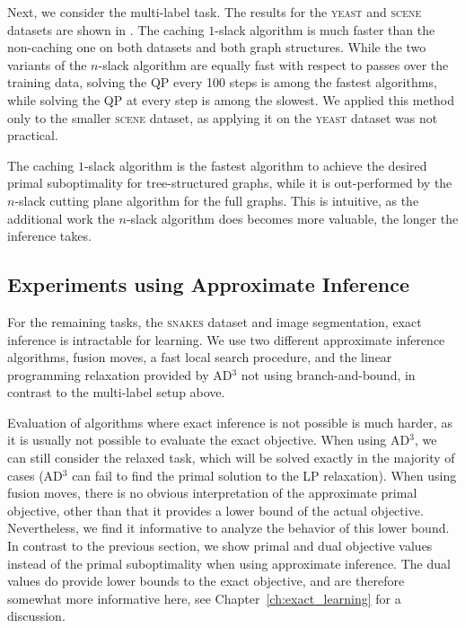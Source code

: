Next, we consider the multi-label task.  The results for the \textsc{yeast} and \textsc{scene}
datasets are shown in . The caching $1$-slack
algorithm is much faster than the non-caching one on both datasets and both
graph structures.
While the two variants of the $n$-slack algorithm are equally fast with respect
to passes over the training data, solving the QP every 100 steps is among the
fastest algorithms, while solving the QP at every step is among the slowest.
We applied this method only to the smaller \textsc{scene} dataset, as applying it on the
\textsc{yeast} dataset was not practical.

The caching $1$-slack algorithm is the fastest algorithm to achieve the desired
primal suboptimality for tree-structured graphs, while it is out-performed by
the $n$-slack cutting plane algorithm for the full graphs. This is intuitive,
as the additional work the $n$-slack algorithm does becomes more valuable, the
longer the inference takes. 



\subsection{Experiments using Approximate Inference}
For the remaining tasks, the \textsc{snakes} dataset and image segmentation, exact
inference is intractable for learning.
%
We use two different approximate inference algorithms, fusion moves, a fast
local search procedure, and the linear programming relaxation provided by AD$^3$
not using branch-and-bound, in contrast to the multi-label setup above.

Evaluation of algorithms where exact inference is not possible is much harder,
as it is usually not possible to evaluate the exact objective. When using AD$^3$,
we can still consider the relaxed task, which will be solved exactly in the
majority of cases (AD$^3$ can fail to find the primal solution to the LP
relaxation).
When using fusion moves, there is no obvious interpretation of the approximate
primal objective, other than that it provides a lower bound of the actual
objective. Nevertheless, we find it informative to analyze the behavior of this
lower bound. In contrast to the previous section, we show primal and dual objective
values instead of the primal suboptimality when using approximate inference.
The dual values do provide lower bounds
to the exact objective, and are therefore somewhat more informative here, see
Chapter~\ref{ch:exact_learning} for a discussion.

